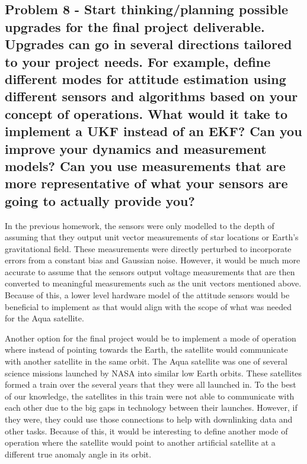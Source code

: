\subsection{Problem 8 - Start thinking/planning possible upgrades for the final project deliverable. Upgrades can go in several directions tailored to your project needs. For example, define different modes for attitude estimation using different sensors and algorithms based on your concept of operations. What would it take to implement a UKF instead of an EKF? Can you improve your dynamics and measurement models? Can you use measurements that are more representative of what your sensors are going to actually provide you?}

In the previous homework, the sensors were only modelled to the depth of assuming that they output unit vector measurements of star locations or Earth's gravitational field. These measurements were directly perturbed to incorporate errors from a constant bias and Gaussian noise. However, it would be much more accurate to assume that the sensors output voltage measurements that are then converted to meaningful measurements such as the unit vectors mentioned above. Because of this, a lower level hardware model of the attitude sensors would be beneficial to implement as that would align with the scope of what was needed for the Aqua satellite. 

Another option for the final project would be to implement a mode of operation where instead of pointing towards the Earth, the satellite would communicate with another satellite in the same orbit. The Aqua satellite was one of several science missions launched by NASA into similar low Earth orbits. These satellites formed a train over the several years that they were all launched in. To the best of our knowledge, the satellites in this train were not able to communicate with each other due to the big gaps in technology between their launches. However, if they were, they could use those connections to help with downlinking data and other tasks. Because of this, it would be interesting to define another mode of operation where the satellite would point to another artificial satellite at a different true anomaly angle in its orbit.